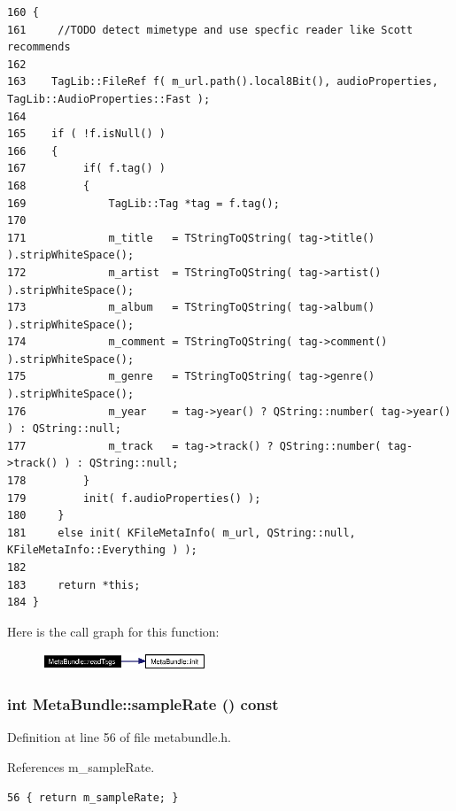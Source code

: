 \footnotesize\begin{verbatim}160 {
161     //TODO detect mimetype and use specfic reader like Scott recommends
162 
163    TagLib::FileRef f( m_url.path().local8Bit(), audioProperties, TagLib::AudioProperties::Fast );
164 
165    if ( !f.isNull() )
166    {
167         if( f.tag() )
168         {
169             TagLib::Tag *tag = f.tag();
170 
171             m_title   = TStringToQString( tag->title() ).stripWhiteSpace();
172             m_artist  = TStringToQString( tag->artist() ).stripWhiteSpace();
173             m_album   = TStringToQString( tag->album() ).stripWhiteSpace();
174             m_comment = TStringToQString( tag->comment() ).stripWhiteSpace();
175             m_genre   = TStringToQString( tag->genre() ).stripWhiteSpace();
176             m_year    = tag->year() ? QString::number( tag->year() ) : QString::null;
177             m_track   = tag->track() ? QString::number( tag->track() ) : QString::null;
178         }
179         init( f.audioProperties() );
180     }
181     else init( KFileMetaInfo( m_url, QString::null, KFileMetaInfo::Everything ) );
182 
183     return *this;
184 }
\end{verbatim}\normalsize 


Here is the call graph for this function:\begin{figure}[H]
\begin{center}
\leavevmode
\includegraphics[width=139pt]{classMetaBundle_MetaBundlea4_cgraph}
\end{center}
\end{figure}
\subsubsection{\setlength{\rightskip}{0pt plus 5cm}int Meta\-Bundle::sample\-Rate () const\hspace{0.3cm}{\tt  [inline]}}\label{classMetaBundle_MetaBundlea7}




Definition at line 56 of file metabundle.h.

References m\_\-sample\-Rate.



\footnotesize\begin{verbatim}56 { return m_sampleRate; }
\end{verbatim}\normalsize 
{}

